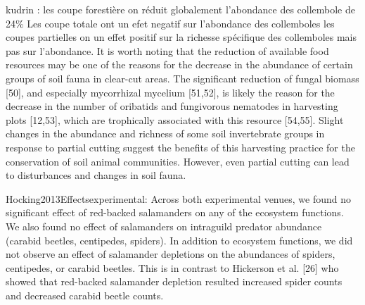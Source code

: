 kudrin : les coupe forestière on réduit globalement l'abondance des collembole de 24\%
Les coupe totale ont un efet negatif sur l'abondance des collemboles
les coupes partielles on un effet positif sur la richesse spécifique des collemboles mais pas sur l'abondance.
It is worth noting that the reduction of available food resources may be one of the reasons for the decrease in the abundance of certain groups of soil fauna in clear-cut areas. The significant reduction of fungal biomass [50], and especially mycorrhizal mycelium [51,52], is likely the reason for the decrease in the number of oribatids and fungivorous nematodes in harvesting plots [12,53], which are trophically associated with this resource [54,55].
Slight changes in the abundance and richness of some soil invertebrate groups in response to partial cutting suggest the benefits of this harvesting practice for the conservation of soil animal communities. However, even partial cutting can lead to disturbances and changes in soil fauna.





Hocking2013Effectsexperimental: 
Across both experimental venues, we found no significant effect of red-backed salamanders on any of the ecosystem functions. We also found no effect of salamanders on intraguild predator abundance (carabid beetles, centipedes, spiders).
In addition to ecosystem functions, we did not observe an effect of salamander depletions on the abundances of spiders, centipedes, or carabid beetles. This is in contrast to Hickerson et al. [26] who showed that red-backed salamander depletion resulted increased spider counts and decreased carabid beetle counts.

